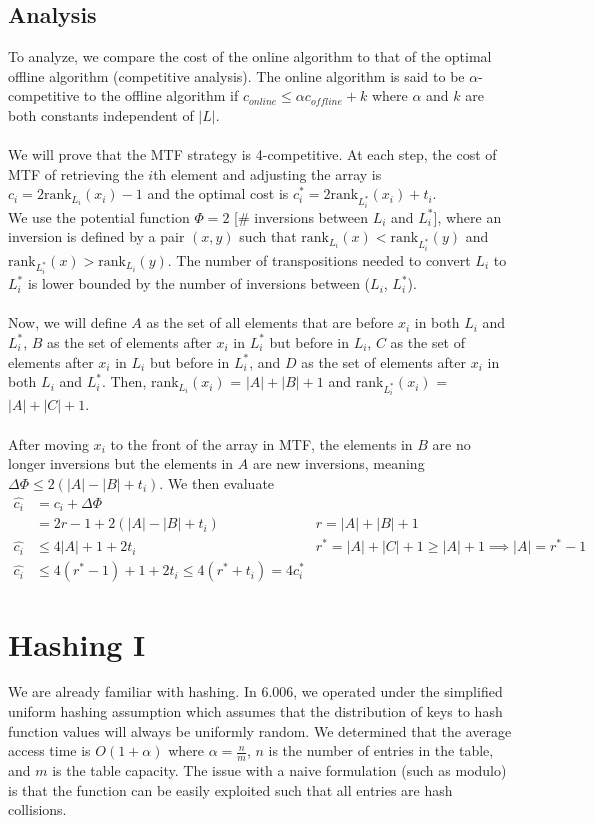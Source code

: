 \documentclass{article}
\begin{document}
\subsection*{Analysis}
To analyze, we compare the cost of the online algorithm to that of the optimal offline algorithm (competitive analysis). The online algorithm is said to be $\alpha$-competitive to the offline algorithm if $c_{online} \leq \alpha c_{offline} + k$ where $\alpha$ and $k$ are both constants independent of $|L|$.\\
\\
We will prove that the MTF strategy is 4-competitive. At each step, the cost of MTF of retrieving the $i$th element and adjusting the array is $c_i = 2 \text{rank}_{L_i}(x_i) - 1$ and the optimal cost is $c_i^* = 2 \text{rank}_{L_i^*}(x_i) + t_i$.
\\
We use the potential function $\Phi = 2$ [\# inversions between $L_i$ and $L_i^*$], where an inversion is defined by a pair $(x, y)$ such that $\text{rank}_{L_i}(x) < \text{rank}_{L_i^*}(y)$ and $\text{rank}_{L_i^*}(x) > \text{rank}_{L_i}(y)$. The number of transpositions needed to convert $L_i$ to $L_i^*$ is lower bounded by the number of inversions between ($L_i$, $L_i^*$).\\
\\
Now, we will define $A$ as the set of all elements that are before $x_i$ in both $L_i$ and $L_i^*$, $B$ as the set of elements after $x_i$ in $L_i^*$ but before in $L_i$, $C$ as the set of elements after $x_i$ in $L_i$ but before in $L_i^*$, and $D$ as the set of elements after $x_i$ in both $L_i$ and $L_i^*$. Then, rank$_{L_i}(x_i)$ = $|A| + |B| + 1$ and rank$_{L_i^*}(x_i)$ = $|A| + |C| + 1$.\\
\\
After moving $x_i$ to the front of the array in MTF, the elements in $B$ are no longer inversions but the elements in $A$ are new inversions, meaning $\Delta \Phi \leq 2(|A| - |B| + t_i)$. We then evaluate
\begin{align*}
    \hat{c_i} &= c_i + \Delta \Phi\\
    &= 2r - 1 + 2(|A| - |B| + t_i) &r = |A| + |B| + 1\\
    \hat{c_i} &\leq 4|A| + 1 + 2 t_i &r^* = |A| + |C| + 1 \geq |A| + 1 \implies |A| = r^* - 1\\
    \hat{c_i} &\leq 4 (r^* - 1)  + 1 + 2 t_i \leq 4 (r^* + t_i) = 4 c_i^*
\end{align*}
\section{Hashing I}
We are already familiar with hashing. In 6.006, we operated under the simplified uniform hashing assumption which assumes that the distribution of keys to hash function values will always be uniformly random. We determined that the average access time is $O(1 + \alpha)$ where $\alpha = \frac{n}{m}$, $n$ is the number of entries in the table, and $m$ is the table capacity. The issue with a naive formulation (such as modulo) is that the function can be easily exploited such that all entries are hash collisions.
\end{document}
